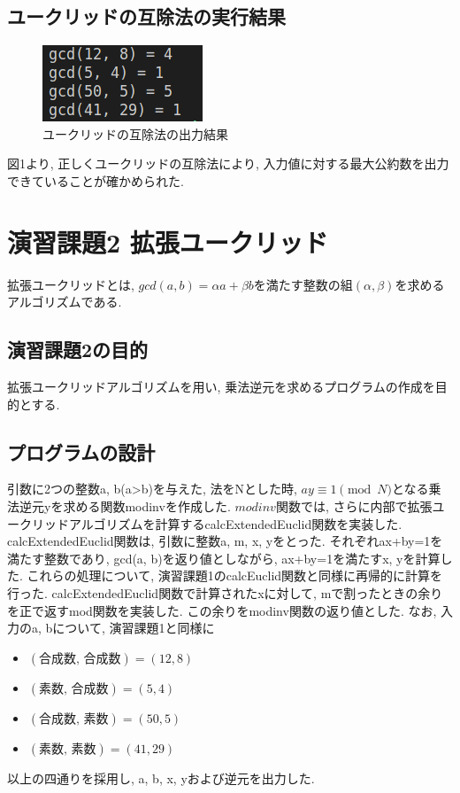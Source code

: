 \documentclass[xelatex, 11pt, a4paper, ja=standard]{bxjsarticle}
\begin{document}
\subsection{ユークリッドの互除法の実行結果}

\begin{figure}[htbp]
    \centering
    \includegraphics[height=0.15\textwidth,keepaspectratio]{./image/euclid.png}
    \caption{ユークリッドの互除法の出力結果}
    \label{fig:screenshot}
\end{figure}

図1より, 正しくユークリッドの互除法により, 入力値に対する最大公約数を出力できていることが確かめられた. 

\section{演習課題2 拡張ユークリッド}
    拡張ユークリッドとは, $gcd(a,b) = \alpha a+\beta b$を満たす整数の組$(\alpha, \beta)$を求めるアルゴリズムである. 
\subsection{演習課題2の目的}
拡張ユークリッドアルゴリズムを用い, 乗法逆元を求めるプログラムの作成を目的とする. 

\subsection{プログラムの設計}
引数に2つの整数a, b(a>b)を与えた, 法をNとした時, $ ay \equiv 1 \pmod {N} $となる乗法逆元yを求める関数modinvを作成した. 
$modinv$関数では, さらに内部で拡張ユークリッドアルゴリズムを計算するcalcExtendedEuclid関数を実装した. 
calcExtendedEuclid関数は, 引数に整数a, m, x, yをとった. 
それぞれax+by=1を満たす整数であり, gcd(a, b)を返り値としながら, ax+by=1を満たすx, yを計算した. 
これらの処理について, 演習課題1のcalcEuclid関数と同様に再帰的に計算を行った. 
calcExtendedEuclid関数で計算されたxに対して, mで割ったときの余りを正で返すmod関数を実装した. 
この余りをmodinv関数の返り値とした. 
なお, 入力のa, bについて, 演習課題1と同様に
\begin{itemize}
    \item $(\text{合成数, 合成数}) = (12, 8)$
    \item $(\text{素数, 合成数}) = (5, 4)$
    \item $(\text{合成数, 素数}) = (50, 5)$
    \item $(\text{素数, 素数}) = (41, 29)$
\end{itemize}
以上の四通りを採用し, a, b, x, yおよび逆元を出力した. 
\end{document}
